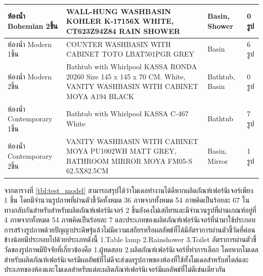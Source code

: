 \documentclass[12pt,oneside,openright,a4paper]{cpe-thai-project}
\begin{document}
\begin{table}
\begin{tabular}{|p{2.5cm}|p{5cm}|p{3cm}|p{3cm}|}
    \hline
    ห้องน้ำ Bohemian 2ชิ้น                                            & WALL-HUNG WASHBASIN KOHLER K-17156X WHITE, CT623Z94Z84 RAIN SHOWER                                                      & Basin, Shower                           & 0 รูป                             \\
    \hline
    ห้องน้ำ Modern 1ชิ้น                                              & COUNTER WASHBASIN WITH CABINET TOTO LBAT501PGR GREY                                                                     & Basin                                   & 6 รูป                             \\
    \hline
    ห้องน้ำ Modern 2ชิ้น                                              & Bathtub with Whirlpool KASSA RONDA 20260 Size 145 x 145 x 70 CM. White, VANITY WASHBASIN WITH CABINET MOYA A194 BLACK   & Bathtub, Basin                          & 0 รูป                             \\
    \hline
    ห้องน้ำ Contemporary 1ชิ้น                                        & Bathtub with Whirlpool KASSA C-467 White                                                                                & Bathtub                                 & 7 รูป                             \\
    \hline
    ห้องน้ำ Contemporary 2ชิ้น                                        & VANITY WASHBASIN WITH CABINET MOYA PU1002WH MATT GREY, BATHROOM MIRROR MOYA FM05-S 62.5X82.5CM                          & Basin, Mirror                           & 1 รูป                             \\
    \hline
  \end{tabular}
\end{table}
\hspace{18pt}จากตารางที่ \ref{tbl:test_model} สามารถสรุปได้ว่าโมเดลทำงานได้ดีหากผลิตภัณฑ์เฟอร์นิเจอร์เพียง 1 ชิ้น โดยมีจำนวนรูปภาพที่ผ่านตัวชี้วัดทั้งหมด 36 ภาพจากทั้งหมด 54 ภาพคิดเป็นร้อยละ 67 ในทางกลับกันสำหรับสำหรับผลิตภัณฑ์เฟอร์นิเจอร์ 2 ชิ้นยังคงไม่เสถียรและมีจำนวนรูปที่ผ่านเกณฑ์อยู่ที่ 4 ภาพจากทั้งหมด 54 ภาพคิดเป็นร้อยละ 7 และประเภทของผลิตภัณฑ์เฟอร์นิเจอร์ที่นำมาใช้ประกอบการสร้างรูปภาพด้วยปัญญาประดิษฐ์แล้วไม่มีความเสถียรหรือผลลัพธ์ที่ได้มีอัตราการผ่านตัวชี้วัดที่ค่อนข้างน้อยมีประกอบไปด้วยประเภทดังนี้ 1.Table lamp 2.Rainshower 3.Toilet อัตราการผ่านตัวชี้วัดของรูปภาพมีปัจจัยที่เกี่ยวข้องคือ 1.ผู้ทดสอบ 2.ผลิตภัณฑ์เฟอร์นิเจอร์ที่ทำการเลือก โดยหากโมเดลสำหรับผลิตภัณฑ์เฟอร์นิเจอร์มีผลลัพธ์ที่ไม่ดีจะส่งผลรูปภาพของห้องที่ใช้ทั้งโมเดลสำหรับสไตล์และประเภทของห้องและโมเดลสำหรับแต่ละผลิตภัณฑ์เฟอร์นิเจอร์มีผลลัพธ์ที่ไม่ดีเช่นเดียวกัน
\vspace{\fill}\clearpage
\end{document}

